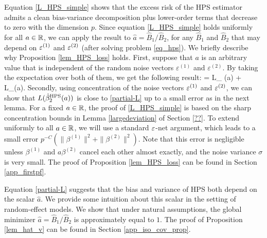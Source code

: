 Equation \eqref{L_HPS_simple} shows that the excess risk of the HPS estimator admits a clean bias-variance decomposition plus lower-order terms that decrease to zero with the dimension $p$.
Since equation \eqref{L_HPS_simple} holds uniformly for all $a\in \mathbb{R}$, we can apply the result to $\hat a = \hat{B}_1 / \hat{B}_2$, for any $\hat{B}_1$ and $\hat{B}_2$ that may depend on ${\varepsilon}^{(1)}$ and ${\varepsilon}^{(2)}$ (after solving problem \eqref{eq_hps}).
We briefly describe why Proposition \ref{lem_HPS_loss} holds.
First, suppose that $a$ is an arbitrary value that is independent of the random noise vectors $\varepsilon^{(1)}$ and $\varepsilon^{(2)}$.
By taking the expectation over both of them, we get the following result:
\be\label{partial-L}
     = L_{\bias} (\hat a) + L_{\var}(\hat a).
\ee
Secondly, using concentration of the noise vectors ${\varepsilon}^{(1)}$ and ${\varepsilon}^{(2)}$, we can show that $L(\hat{\beta}_2^{\textup{HPS}}(a))$ is close to \eqref{partial-L} up to a small error as in the next lemma.
For a fixed $a\in \mathbb{R}$, the proof of \eqref{L_HPS_simple} is based on the sharp concentration bounds in Lemma \ref{largedeviation} of Section \ref{??}.
To extend uniformly to all $a\in \mathbb{R}$, we will use a standard ${\varepsilon}$-net argument, which leads to a small error $ p^{-C}\left( \|\beta^{(1)} \|^2  +  \|\beta^{(2)} \|^2\right) $. Note that this error is negligible unless $\beta^{(1)}$ and $ a\beta^{(2)}$ cancel each other almost exactly, and the noise variance $\sigma$ is very small.
The proof of Proposition \ref{lem_HPS_loss} can be found in Section  \ref{app_firstpf}.

Equation \eqref{partial-L} suggests that the bias and variance of HPS both depend on the scalar $\hat a$.
We provide some intuition about this scalar in the setting of random-effect models.
We show that under natural assumptions, the global minimizer $\hat a = \hat B_1 / \hat B_2$ is approximately equal to $1$.
The proof of Proposition \ref{lem_hat_v} can be found in Section \ref{app_iso_cov_prop}.

